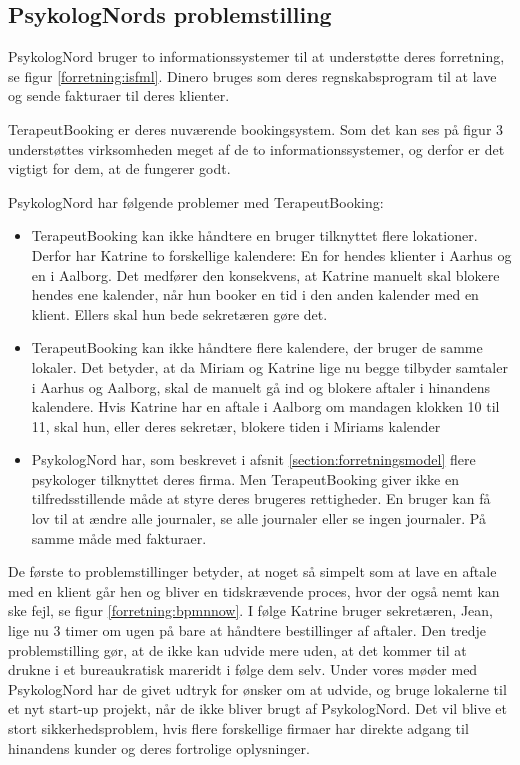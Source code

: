 \subsection{PsykologNords problemstilling}
\label{section:problemstilling}

PsykologNord bruger to informationssystemer til at understøtte deres forretning, se figur \ref{forretning:isfml}.
Dinero bruges som deres regnskabsprogram til at lave og sende fakturaer til deres klienter.

TerapeutBooking er deres nuværende bookingsystem.
Som det kan ses på figur 3 understøttes virksomheden meget af de to informationssystemer, og derfor er det vigtigt for dem, at de fungerer godt.

PsykologNord har følgende problemer med TerapeutBooking:

\begin{itemize}
    \item TerapeutBooking kan ikke håndtere en bruger tilknyttet flere lokationer.
    Derfor har Katrine to forskellige kalendere: En for hendes klienter i Aarhus og en i Aalborg.
    Det medfører den konsekvens, at Katrine manuelt skal blokere hendes ene kalender, når hun booker en tid i den anden kalender med en klient. Ellers skal hun bede sekretæren gøre det.
    
    \item TerapeutBooking kan ikke håndtere flere kalendere, der bruger de samme lokaler.
    Det betyder, at da Miriam og Katrine lige nu begge tilbyder samtaler i Aarhus og Aalborg, skal de manuelt gå ind og blokere aftaler i hinandens kalendere.
    Hvis Katrine har en aftale i Aalborg om mandagen klokken 10 til 11, skal hun, eller deres sekretær, blokere tiden i Miriams kalender
    
   \item PsykologNord har, som beskrevet i afsnit \ref{section:forretningsmodel} flere psykologer tilknyttet deres firma.
   Men TerapeutBooking giver ikke en tilfredsstillende måde at styre deres brugeres rettigheder.
   En bruger kan få lov til at ændre alle journaler, se alle journaler eller se ingen journaler.
   På samme måde med fakturaer.
\end{itemize}

De første to problemstillinger betyder, at noget så simpelt som at lave en aftale med en klient går hen og bliver en tidskrævende proces, hvor der også nemt kan ske fejl, se figur \ref{forretning:bpmnnow}.
I følge Katrine bruger sekretæren, Jean, lige nu 3 timer om ugen på bare at håndtere bestillinger af aftaler.
Den tredje problemstilling gør, at de ikke kan udvide mere uden, at det kommer til at drukne i et bureaukratisk mareridt i følge dem selv.
Under vores møder med PsykologNord har de givet udtryk for ønsker om at udvide, og bruge lokalerne til et nyt start-up projekt, når de ikke bliver brugt af PsykologNord.
Det vil blive et stort sikkerhedsproblem, hvis flere forskellige firmaer har direkte adgang til hinandens kunder og deres fortrolige oplysninger.



